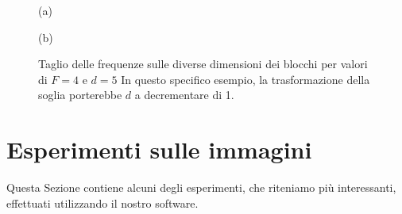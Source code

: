 \begin{figure}
	\begin{minipage}{0.5\textwidth}
		\begin{center}
		
		\end{center}
		\begin{center}
			(a)
		\end{center}
	\end{minipage}\hfill
	\begin{minipage}{0.5\textwidth}
		\begin{center}
		\end{center}
	\begin{center}
		(b)
	\end{center}
\end{minipage}
\caption{Taglio delle frequenze sulle diverse dimensioni dei blocchi per valori di $F=4$ e $d=5$ In questo specifico esempio, la trasformazione della soglia porterebbe $d$ a decrementare di 1.}\label{fig:taglio}
\end{figure}

\section{Esperimenti sulle immagini}
Questa Sezione contiene alcuni degli esperimenti, che riteniamo più interessanti, effettuati utilizzando il nostro software.

